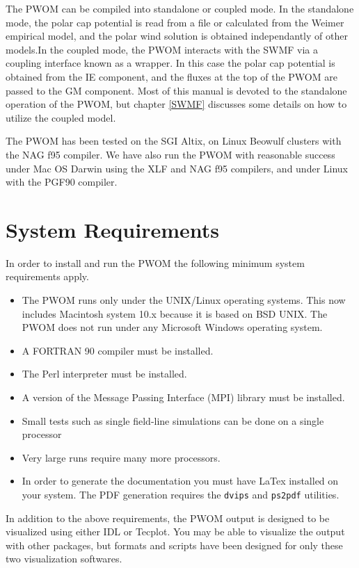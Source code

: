The PWOM can be compiled into standalone or coupled mode. In the standalone 
mode, the polar cap potential is read from a file or calculated from the 
Weimer empirical model, and the polar wind solution is obtained independantly 
of other models.In the coupled mode, the PWOM interacts with the SWMF 
via a coupling interface known as a wrapper. In this case the polar 
cap potential is obtained from the IE component, and the fluxes at the top 
of the PWOM are passed to the GM component. Most of this manual is devoted to 
the standalone operation of the PWOM, but chapter \ref{SWMF} discusses some 
details on how to utilize the coupled model.

The PWOM has been tested on the SGI Altix, on Linux Beowulf clusters with the 
NAG f95 compiler. We have also run the PWOM with reasonable success under
Mac OS Darwin using the XLF and NAG f95 compilers, and under Linux with
the PGF90 compiler.

\section{System Requirements}

In order to install and run the PWOM the following minimum system
requirements apply.

\begin{itemize}
\item The PWOM runs only under the UNIX/Linux operating systems.  This now
  includes Macintosh system 10.x because it is based on BSD UNIX.  The
  PWOM does not run under any Microsoft Windows operating system.
\item A FORTRAN 90 compiler must be installed.
\item The Perl interpreter must be installed.
\item A version of the Message Passing Interface (MPI) library must be
  installed.
\item Small tests such as single  field-line simulations can be done on a 
  single processor
\item Very large runs require many more processors.
\item In order to generate the documentation you must have LaTex installed on
your system.  The PDF generation requires the {\tt dvips} and {\tt ps2pdf}
utilities. 

\end{itemize}


In addition to the above requirements, the PWOM output is designed to
be visualized using either IDL or Tecplot.  You may be able to
visualize the output with other packages, but formats and scripts have
been designed for only these two visualization softwares.


